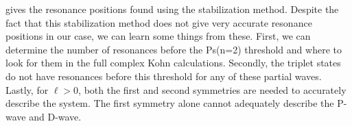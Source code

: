 \documentclass[Dissertation.tex]{subfiles}
\begin{document}
 gives the resonance positions found using the stabilization method. Despite the fact that this stabilization method does not give very accurate resonance positions in our case, we can learn some things from these. First, we can determine the number of resonances before the Ps(n=2) threshold and where to look for them in the full complex Kohn calculations. Secondly, the triplet states do not have resonances before this threshold for any of these partial waves. Lastly, for $\ell > 0$, both the first and second symmetries are needed to accurately describe the system. The first symmetry alone cannot adequately describe the P-wave and D-wave.




\biblio
\end{document}
